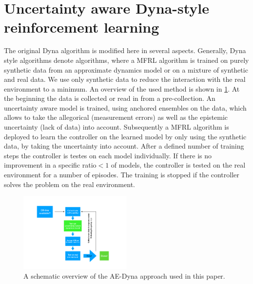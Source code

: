 \documentclass[
 reprint,
 amsmath,amssymb,amsfonts,clevref,
 aps,
prstab,
]{revtex4-2}
\begin{document}
\section{Uncertainty aware Dyna-style reinforcement learning}
The original Dyna algorithm \cite{Kurutach2018} is modified here in several aspects. Generally, Dyna style algorithms \cite{Sutton1991} denote algorithms, where a MFRL algorithm is trained on purely synthetic data from an approximate dynamics model or on a mixture of synthetic and real data. We use only synthetic data to reduce the interaction with the real environment to a minimum.
An overview of the used method is shown in \cref{fig:MBRL_overview}. At the beginning the data is collected or read in from a pre-collection. An uncertainty aware model is trained, using anchored ensembles \cite{Pearce2018} on the data, which allows to take the allegorical (measurement errors) as well as the epistemic uncertainty (lack of data) into account. Subsequently a MFRL algorithm is deployed to learn the controller on the learned model by only using the synthetic data, by taking the uncertainty into account. After a defined number of training steps the controller is testes on each model individually. If there is no improvement in a specific ratio$<1$ of models, the controller is tested on the real environment for a number of episodes. The training is stopped if the controller solves the problem on the real environment.

\begin{figure}[!h]
	\centering
	\includegraphics*[width=0.5\textwidth]{Figures/MBRL_overview}
	\caption{A schematic overview of the AE-Dyna approach used in this paper.}
	\label{fig:MBRL_overview}
\end{figure}
\end{document}
